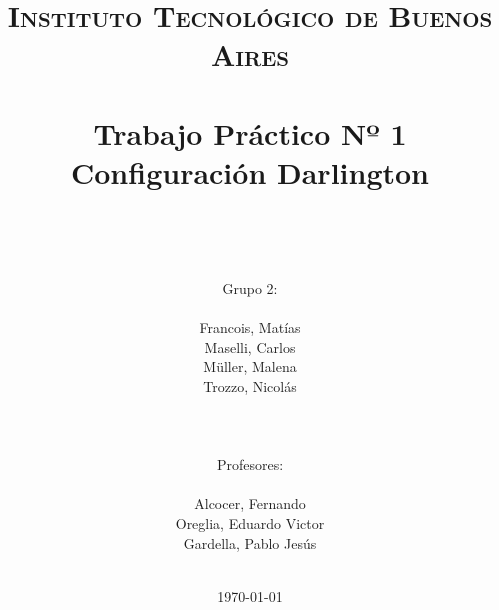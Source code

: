 



\title{
	\normalfont \normalsize \textsc{Instituto Tecnol\'ogico de Buenos Aires} \\ [25pt]
	\horrule{2pt} \\[0.4cm]
	\huge Trabajo Pr\'actico Nº 1\\ Configuraci\'on Darlington \\
	\horrule{2pt} \\[0cm]
\author{\\Grupo 2:\\\\Francois, Mat\'ias\\Maselli, Carlos\\ M\"uller, Malena\\ Trozzo, Nicol\'as\\ \\ \\ \\
Profesores: \\\\ Alcocer, Fernando\\ Oreglia, Eduardo Victor \\Gardella, Pablo Jes\'us\\ \\ } 
}
\date{\today} 

\maketitle
\newpage

\tableofcontents

\newpage

\newpage


\newpage

